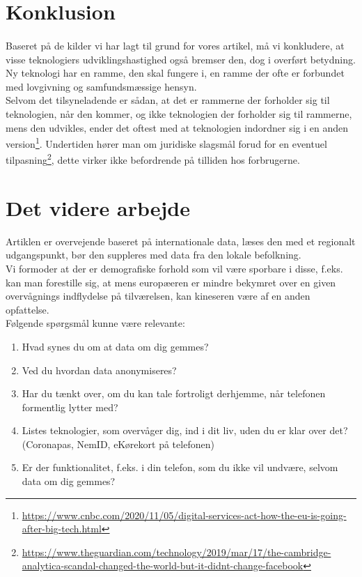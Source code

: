 \documentclass{article}
\begin{document}
\section{Konklusion}
\paragraph{}
Baseret på de kilder vi har lagt til grund for vores artikel, må vi konkludere, at visse teknologiers udviklingshastighed også bremser den, dog i overført betydning. Ny teknologi har en ramme, den skal fungere i, en ramme der ofte er forbundet med lovgivning og samfundsmæssige hensyn. \\
Selvom det tilsyneladende er sådan, at det er rammerne der forholder sig til teknologien, når den kommer, og ikke teknologien der forholder sig til rammerne, mens den udvikles, ender det oftest med at teknologien indordner sig i en anden version\footnote{\url{https://www.cnbc.com/2020/11/05/digital-services-act-how-the-eu-is-going-after-big-tech.html}}.
Undertiden hører man om juridiske slagsmål forud for en eventuel tilpasning\footnote{\url{https://www.theguardian.com/technology/2019/mar/17/the-cambridge-analytica-scandal-changed-the-world-but-it-didnt-change-facebook}}, dette virker ikke befordrende på tilliden hos forbrugerne.

\section{Det videre arbejde}
Artiklen er overvejende baseret på internationale data, læses den med et regionalt udgangspunkt, bør den suppleres med data fra den lokale befolkning. \\
Vi formoder at der er demografiske forhold som vil være sporbare i disse, f.eks. kan man forestille sig, at mens europæeren er mindre bekymret over en given overvågnings indflydelse på tilværelsen, kan kineseren være af en anden opfattelse.
\\
Følgende spørgsmål kunne være relevante:
\begin{enumerate}
    \item Hvad synes du om at data om dig gemmes?
    \item Ved du hvordan data anonymiseres?
    \item Har du tænkt over, om du kan tale fortroligt derhjemme, når telefonen formentlig lytter med?
    \item Listes teknologier, som overvåger dig, ind i dit liv, uden du er klar over det? (Coronapas, NemID, eKørekort på telefonen)
    \item Er der funktionalitet, f.eks. i din telefon, som du ikke vil undvære, selvom data om dig gemmes?
\end{enumerate}
\end{document}
